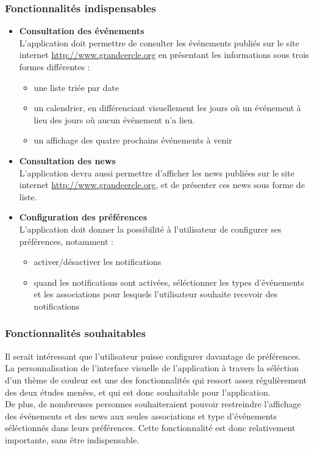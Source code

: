 \documentclass[a4paper, 11px]{article}
\begin{document}
\subsubsection{Fonctionnalités indispensables}
\begin{itemize}
	\item[\textbullet] \textbf{Consultation des événements}\\
	L'application doit permettre de consulter les événements publiés sur le site internet \underline{http://www.grandcercle.org} en présentant les informations sous trois formes différentes :
	\begin{itemize}
		\item une liste triée par date
		\item un calendrier, en différenciant visuellement les jours où un événement à lieu des jours où aucun événement n'a lieu.
		\item un affichage des quatre prochains événements à venir
	\\
	\end{itemize}

	\item[\textbullet] \textbf{Consultation des news}\\
	L'application devra aussi permettre d'afficher les news publiées sur le site internet \underline{http://www.grandcercle.org}, et de présenter ces news sous forme de liste.\\
	\item[\textbullet] \textbf{Configuration des préférences}\\
	L'application doit donner la possibilité à l'utilisateur de configurer ses préférences, notamment :
	\begin{itemize}
		\item activer/désactiver les notifications
		\item quand les notifications sont activées, séléctionner les types d'événements et les associations pour lesquels l'utilisateur souhaite recevoir des notifications
	\end{itemize}
\end{itemize}
\subsubsection{Fonctionnalités souhaitables}
Il serait intéressant que l'utilisateur puisse configurer davantage de préférences.\\
\indent La personnalisation de l'interface visuelle de l'application à travers la séléction d'un thème de couleur est une des fonctionnalités qui ressort assez régulièrement des deux études menées, et qui est donc souhaitable pour l'application.\\
\indent De plus, de nombreuses personnes souhaiteraient pouvoir restreindre l'affichage des événements et des news aux seules associations et type d'événements séléctionnés dans leurs préférences. Cette fonctionnalité est donc relativement importante, sans être indispensable.
\end{document}
